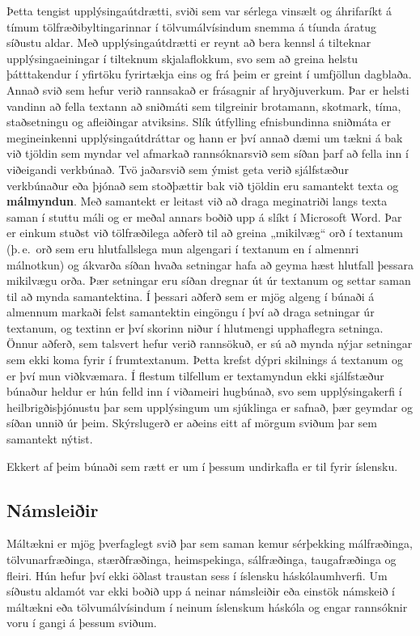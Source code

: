\begin{multicols}{2}
Þetta tengist upplýsingaútdrætti, sviði sem var sérlega vinsælt og áhrifaríkt á tímum tölfræðibyltingarinnar í tölvumálvísindum snemma á tíunda áratug síðustu aldar. Með upplýsingaútdrætti er reynt að bera kennsl á tilteknar upplýsingaeiningar í tilteknum skjalaflokkum, svo sem að greina helstu þátttakendur í yfirtöku fyrirtækja eins og frá þeim er greint í umfjöllun dagblaða. Annað svið sem hefur verið rannsakað er frásagnir af hryðjuverkum. Þar er helsti vandinn að fella textann að sniðmáti sem tilgreinir brotamann, skotmark, tíma, staðsetningu og afleiðingar atviksins. Slík útfylling efnisbundinna sniðmáta er megineinkenni upplýsingaútdráttar og hann er því annað dæmi um tækni á bak við tjöldin sem myndar vel afmarkað rannsóknarsvið sem síðan þarf að fella inn í viðeigandi verkbúnað. 
Tvö jaðarsvið sem ýmist geta verið sjálfstæður verkbúnaður eða þjónað sem stoðþættir bak við tjöldin eru samantekt texta og \textbf{málmyndun}. Með samantekt er leitast við að draga meginatriði langs texta saman í stuttu máli og er meðal annars boðið upp á slíkt í Microsoft Word. Þar er einkum stuðst við tölfræðilega aðferð til að greina „mikilvæg“ orð í textanum (þ.\,e.~orð sem eru hlutfallslega mun algengari í textanum en í almennri málnotkun) og ákvarða síðan hvaða setningar hafa að geyma hæst hlutfall þessara mikilvægu orða. Þær setningar eru síðan dregnar út úr textanum og settar saman til að mynda samantektina. Í þessari aðferð sem er mjög algeng í búnaði á almennum markaði felst samantektin eingöngu í því að draga setningar úr textanum, og textinn er því skorinn niður í hlutmengi upphaflegra setninga. Önnur aðferð, sem talsvert hefur verið rannsökuð, er sú að mynda nýjar setningar sem ekki koma fyrir í frumtextanum. Þetta krefst dýpri skilnings á textanum og er því mun viðkvæmara. Í flestum tilfellum er textamyndun ekki sjálfstæður búnaður heldur er hún felld inn í viðameiri hugbúnað, svo sem upplýsingakerfi í heilbrigðisþjónustu þar sem upplýsingum um sjúklinga er safnað, þær geymdar og síðan unnið úr þeim. Skýrslugerð er aðeins eitt af mörgum sviðum þar sem samantekt nýtist.

Ekkert af þeim búnaði sem rætt er um í þessum undirkafla er til fyrir íslensku.

\subsection{Námsleiðir}

Máltækni er mjög þverfaglegt svið þar sem saman kemur sérþekking málfræðinga, tölvunarfræðinga, stærðfræðinga, heimspekinga, sálfræðinga, taugafræðinga og fleiri. Hún hefur því ekki öðlast traustan sess í íslensku háskólaumhverfi. Um síðustu aldamót var ekki boðið upp á neinar námsleiðir eða einstök námskeið í máltækni eða tölvumálvísindum í neinum íslenskum háskóla og engar rannsóknir voru í gangi á þessum sviðum. 


\end{multicols}
